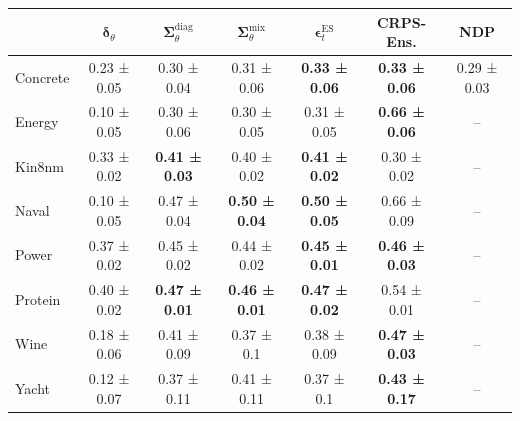 \begin{tabular}{l|c|c|c|c|c|c}
\toprule
 & $\bm\delta_\theta$ & $\bm\Sigma_\theta^{\mathrm{diag}}$ & $\bm\Sigma_\theta^{\mathrm{mix}}$ & $\bm\epsilon_t^\mathrm{ES}$ & CRPS-Ens. & NDP \\
\midrule
Concrete & 0.23 ± 0.05 & 0.30 ± 0.04 & 0.31 ± 0.06 & \textbf{0.33 ± 0.06} & \textbf{0.33 ± 0.06} & 0.29 ± 0.03 \\
Energy & 0.10 ± 0.05 & 0.30 ± 0.06 & 0.30 ± 0.05 & 0.31 ± 0.05 & \textbf{0.66 ± 0.06} & -- \\
Kin8nm & 0.33 ± 0.02 & \textbf{0.41 ± 0.03} & 0.40 ± 0.02 & \textbf{0.41 ± 0.02} & 0.30 ± 0.02 & -- \\
Naval & 0.10 ± 0.05 & 0.47 ± 0.04 & \textbf{0.50 ± 0.04} & \textbf{0.50 ± 0.05} & 0.66 ± 0.09 & -- \\
Power & 0.37 ± 0.02 & 0.45 ± 0.02 & 0.44 ± 0.02 & \textbf{0.45 ± 0.01} & \textbf{0.46 ± 0.03} & -- \\
Protein & 0.40 ± 0.02 & \textbf{0.47 ± 0.01} & \textbf{0.46 ± 0.01} & \textbf{0.47 ± 0.02} & 0.54 ± 0.01 & -- \\
Wine & 0.18 ± 0.06 & 0.41 ± 0.09 & 0.37 ± 0.1 & 0.38 ± 0.09 & \textbf{0.47 ± 0.03} & -- \\
Yacht & 0.12 ± 0.07 & 0.37 ± 0.11 & 0.41 ± 0.11 & 0.37 ± 0.1 & \textbf{0.43 ± 0.17} & -- \\
\bottomrule
\end{tabular}
